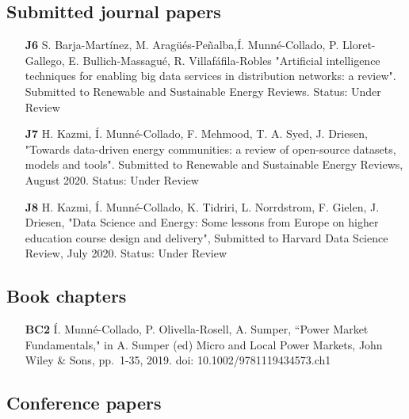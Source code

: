 \subsection*{Submitted journal papers}
\begin{itemize}
	\item [\textbf{J6}] S. Barja-Mart\'{i}nez, M. Arag\"{u}\'{e}s-Pe\~{n}alba,\'{I}. Munn\'{e}-Collado, P. Lloret-Gallego, E. Bullich-Massagu\'{e}, R. Villaf\'{a}fila-Robles "Artificial intelligence techniques for enabling big data services in distribution networks: a review". Submitted to Renewable and Sustainable Energy Reviews. Status: Under Review
	\item [\textbf{J7}] H. Kazmi, \'{I}. Munn\'{e}-Collado, F. Mehmood, T. A. Syed, J. Driesen, "Towards data-driven energy communities: a review of open-source datasets, models and tools". Submitted to Renewable and Sustainable Energy Reviews, August 2020. Status: Under Review
	\item [\textbf{J8}] H. Kazmi, \'{I}. Munn\'{e}-Collado, K. Tidriri, L. Norrdstrom, F. Gielen, J. Driesen, "Data Science and Energy: Some lessons from Europe on higher education course design and delivery", Submitted to Harvard Data Science Review, July 2020. Status: Under Review
\end{itemize}

	
\subsection*{Book chapters}

\begin{itemize}
	\item[\textbf{BC2}] \'{I}. Munn\'{e}-Collado, P. Olivella-Rosell, A. Sumper, ``Power Market Fundamentals," in A. Sumper (ed) Micro and Local Power Markets, John Wiley \& Sons, pp.~1-35, 2019. doi: 10.1002/9781119434573.ch1
\end{itemize}	


\subsection*{Conference papers}

